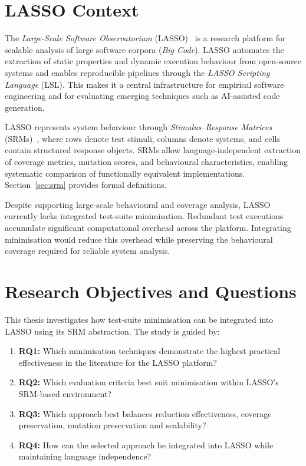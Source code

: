 \section{LASSO Context}

The \emph{Large-Scale Software Observatorium} (LASSO)~\cite{Kessel2022} is a research platform for scalable analysis of large software corpora (\emph{Big Code}). LASSO automates the extraction of static properties and dynamic execution behaviour from open-source systems and enables reproducible pipelines through the \emph{LASSO Scripting Language} (LSL). This makes it a central infrastructure for empirical software engineering and for evaluating emerging techniques such as AI-assisted code generation.

LASSO represents system behaviour through \emph{Stimulus--Response Matrices} (SRMs)~\cite{Kessel2022}, where rows denote test stimuli, columns denote systems, and cells contain structured response objects. SRMs allow language-independent extraction of coverage metrics, mutation scores, and behavioural characteristics, enabling systematic comparison of functionally equivalent implementations. Section~\ref{sec:srm} provides formal definitions.

Despite supporting large-scale behavioural and coverage analysis, LASSO currently lacks integrated test-suite minimisation. Redundant test executions accumulate significant computational overhead across the platform. Integrating minimisation would reduce this overhead while preserving the behavioural coverage required for reliable system analysis.

\section{Research Objectives and Questions}
\label{sec:rq}

This thesis investigates how test-suite minimisation can be integrated into LASSO using its SRM abstraction. The study is guided by:
\begin{enumerate}
  \item \textbf{RQ1:} Which minimisation techniques demonstrate the highest practical effectiveness in the literature for the LASSO platform?
  \item \textbf{RQ2:} Which evaluation criteria best suit minimisation within LASSO's SRM-based environment?
  \item \textbf{RQ3:} Which approach best balances reduction effectiveness, coverage preservation, mutation preservation and scalability?
  \item \textbf{RQ4:} How can the selected approach be integrated into LASSO while maintaining language independence?
\end{enumerate}

